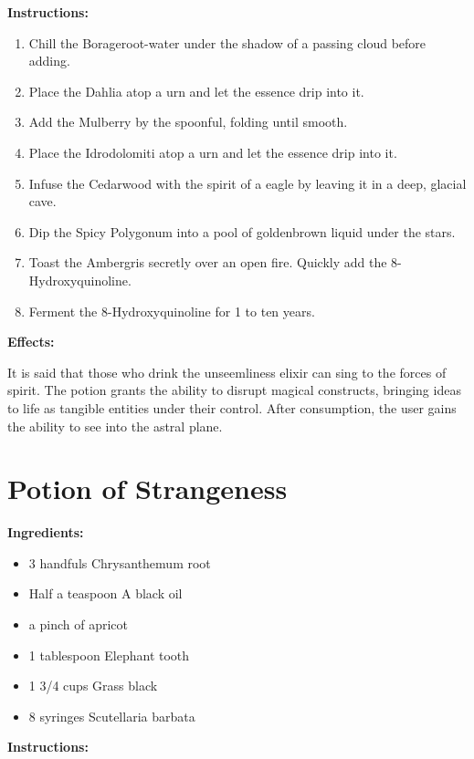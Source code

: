 \documentclass{article}
\begin{document}
\textbf{Instructions:}

\begin{enumerate}
  \item Chill the Borageroot-water under the shadow of a passing cloud before adding.
  \item Place the Dahlia atop a urn and let the essence drip into it.
  \item Add the Mulberry by the spoonful, folding until smooth.
  \item Place the Idrodolomiti atop a urn and let the essence drip into it.
  \item Infuse the Cedarwood with the spirit of a eagle by leaving it in a deep, glacial cave.
  \item Dip the Spicy Polygonum into a pool of goldenbrown liquid under the stars.
  \item Toast the Ambergris secretly over an open fire. Quickly add the 8-Hydroxyquinoline.
  \item Ferment the 8-Hydroxyquinoline for 1 to ten years.
\end{enumerate}

\textbf{Effects:}

It is said that those who drink the unseemliness elixir can sing to the forces of spirit. The potion grants the ability to disrupt magical constructs, bringing ideas to life as tangible entities under their control. After consumption, the user gains the ability to see into the astral plane.

\newpage
\section*{Potion of Strangeness}

\textbf{Ingredients:}

\begin{itemize}
  \item 3 handfuls Chrysanthemum root
  \item Half a teaspoon A black oil
  \item a pinch of apricot
  \item 1 tablespoon Elephant tooth
  \item 1 3/4 cups Grass black
  \item 8 syringes Scutellaria barbata
\end{itemize}

\textbf{Instructions:}
\end{document}

